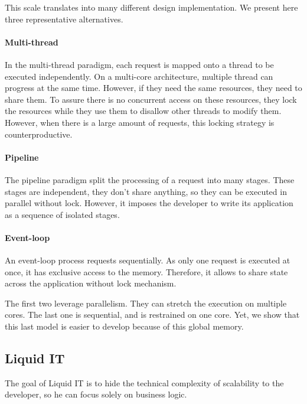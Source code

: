 This scale translates into many different design implementation.
We present here three representative alternatives.

\paragraph{Multi-thread} %

In the multi-thread paradigm, each request is mapped onto a thread to be executed independently.
On a multi-core architecture, multiple thread can progress at the same time.
However, if they need the same resources, they need to share them.
To assure there is no concurrent access on these resources, they lock the resources while they use them to disallow other threads to modify them.
However, when there is a large amount of requests, this locking strategy is counterproductive.

\paragraph{Pipeline} %

The pipeline paradigm split the processing of a request into many stages.
These stages are independent, they don't share anything, so they can be executed in parallel without lock.
However, it imposes the developer to write its application as a sequence of isolated stages.

\paragraph{Event-loop}

An event-loop process requests sequentially.
As only one request is executed at once, it has exclusive access to the memory.
Therefore, it allows to share state across the application without lock mechanism.


The first two leverage parallelism.
They can stretch the execution on multiple cores.
The last one is sequential, and is restrained on one core.
Yet, we show that this last model is easier to develop because of this global memory.






\subsection{Liquid IT}

The goal of Liquid IT is to hide the technical complexity of scalability to the developer, so he can focus solely on business logic.




